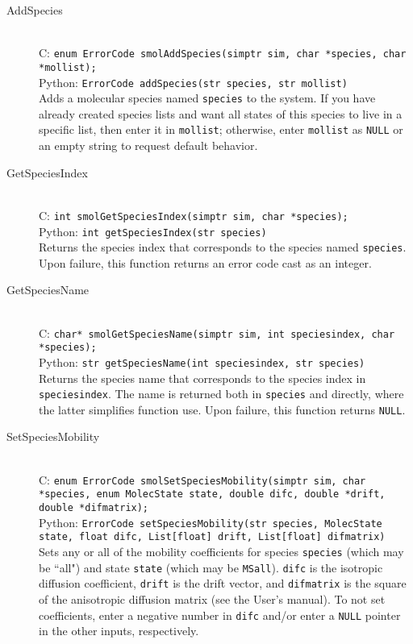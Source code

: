 \documentclass {book}
\begin{document}
\begin{description}

\item[AddSpecies]
\hfill \\
C: \texttt{enum ErrorCode smolAddSpecies(simptr sim, char *species, char *mollist);}\\
Python: \texttt{ErrorCode addSpecies(str species, str mollist)}\\
Adds a molecular species named \texttt{species} to the system. If you have already created species lists and want all states of this species to live in a specific list, then enter it in \texttt{mollist}; otherwise, enter \texttt{mollist} as \texttt{NULL} or an empty string to request default behavior.

\item[GetSpeciesIndex]
\hfill \\
C: \texttt{int smolGetSpeciesIndex(simptr sim, char *species);}\\
Python: \texttt{int getSpeciesIndex(str species)}\\
Returns the species index that corresponds to the species named \texttt{species}. Upon failure, this function returns an error code cast as an integer.

\item[GetSpeciesName]
\hfill \\
C: \texttt{char* smolGetSpeciesName(simptr sim, int speciesindex, char *species);}\\
Python: \texttt{str getSpeciesName(int speciesindex, str species)}\\
Returns the species name that corresponds to the species index in \texttt{speciesindex}. The name is returned both in \texttt{species} and directly, where the latter simplifies function use. Upon failure, this function returns \texttt{NULL}.

\item[SetSpeciesMobility]
\hfill \\
C: \texttt{enum ErrorCode smolSetSpeciesMobility(simptr sim, char *species, enum MolecState state, double difc, double *drift, double *difmatrix);}\\
Python: \texttt{ErrorCode setSpeciesMobility(str species, MolecState state, float difc, List[float] drift, List[float] difmatrix)}\\
Sets any or all of the mobility coefficients for species \texttt{species} (which may be ``all") and state \texttt{state} (which may be \texttt{MSall}). \texttt{difc} is the isotropic diffusion coefficient, \texttt{drift} is the drift vector, and \texttt{difmatrix} is the square of the anisotropic diffusion matrix (see the User's manual). To not set coefficients, enter a negative number in \texttt{difc} and/or enter a \texttt{NULL} pointer in the other inputs, respectively.


\end{description}
\end{document}
